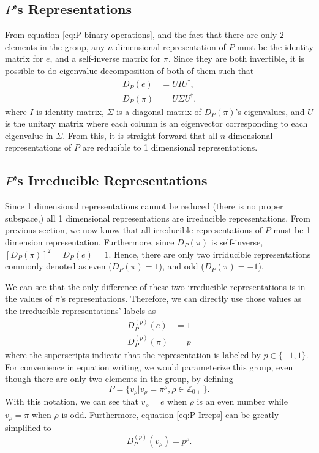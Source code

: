 \documentclass[preprint, 12pt]{revtex4-2}
\numberwithin{equation}{section}
\begin{document}
\subsection{$P$'s Representations}
From equation \ref{eq:P binary operations}, and the fact that there are only 2 elements in the group, any $n$ dimensional representation of $P$ must be the identity matrix for $e$, and a self-inverse matrix for $\pi$. Since they are both invertible, it is possible to do eigenvalue decomposition of both of them such that
\begin{equation}\label{eq:P eigen decompose}
    \begin{aligned}
        D_P(e) &= UIU^\dagger, \\
        D_P(\pi) &= U\Sigma U^\dagger.
    \end{aligned}
\end{equation}
where $I$ is identity matrix, $\Sigma$ is a diagonal matrix of $D_P(\pi)$'s eigenvalues, and $U$ is the unitary matrix where each column is an eigenvector corresponding to each eigenvalue in $\Sigma$. From this, it is straight forward that all $n$ dimensional representations of $P$ are reducible to 1 dimensional representations.

\subsection{$P$'s Irreducible Representations}
Since 1 dimensional representations cannot be reduced (there is no proper subspace,) all 1 dimensional representations are irreducible representations. From previous section, we now know that all irreducible representations of $P$ must be 1 dimension representation. Furthermore, since $D_P(\pi)$ is self-inverse, $[D_P(\pi)]^2= D_P(e)=1$. Hence, there are only two irriducible representations commonly denoted as even ($D_P(\pi)= 1$), and odd ($D_P(\pi)=-1$). 

We can see that the only difference of these two irreducible representations is in the values of $\pi$'s representations. Therefore, we can directly use those values as the irreducible representations' labels as
\begin{equation}\label{eq:P Irreps}
    \begin{aligned}
        D_P^{(p)}(e) &= 1 \\
        D_P^{(p)}(\pi) &= p
    \end{aligned}
\end{equation}
where the superscripts indicate that the representation is labeled by $p\in \{-1, 1\}$. For convenience in equation writing, we would parameterize this group, even though there are only two elements in the group, by defining
\begin{equation}\label{eq:P parameterization}
    P = \{v_\rho|v_\rho=\pi^\rho,\rho\in\mathbb{Z}_{0+}\}.
\end{equation}
With this notation, we can see that $v_\rho=e$ when $\rho$ is an even number while $v_\rho=\pi$ when $\rho$ is odd. Furthermore, equation \ref{eq:P Irreps} can be greatly simplified to
\begin{equation}\label{eq:P Irreps simplify}
    D_P^{(p)}(v_\rho) = p^\rho.
\end{equation}
\end{document}
